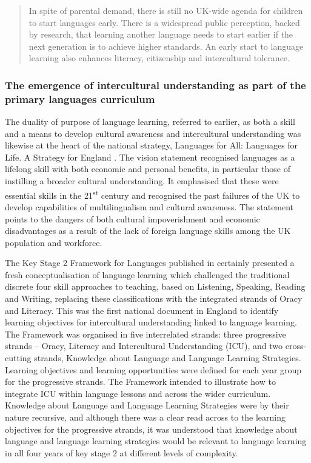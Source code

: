 \documentclass[output=paper]{langscibook}
\begin{document}
\begin{quote}
In spite of parental demand, there is still no UK-wide agenda for children to start languages early. There is a widespread public perception, backed by research, that learning another language needs to start earlier if the next generation is to achieve higher standards. An early start to language learning also enhances literacy, citizenship and intercultural tolerance. \citep[6]{NuffieldFoundation2000}
\end{quote}

\subsubsection{The emergence of intercultural understanding as part of the primary languages curriculum}

The duality of purpose of language learning, referred to earlier, as both a skill and a means to develop cultural awareness and intercultural understanding was likewise at the heart of the national strategy,  Languages for All: Languages for Life. A Strategy for England \citep{DfES2002}. The vision statement recognised languages as a lifelong skill with both economic and personal benefits, in particular those of instilling a broader cultural understanding. It emphasised that these were essential skills in the 21\textsuperscript{st} century and recognised the past failures of the UK to develop capabilities of multilingualism and cultural awareness. The statement points to the dangers of both cultural impoverishment and economic disadvantages as a result of the lack of foreign language skills among the UK population and workforce. 

The Key Stage 2 Framework for Languages published in \citeyear{DCSF2005} certainly presented a fresh conceptualisation of language learning which challenged the traditional discrete four skill approaches to teaching, based on Listening, Speaking, Reading and Writing, replacing these classifications with the integrated strands of Oracy and Literacy. This was the first national document in England to identify learning objectives for intercultural understanding linked to language learning. The Framework was organised in five interrelated strands: three progressive strands -- Oracy, Literacy and Intercultural Understanding (ICU), and two cross-cutting strands, Knowledge about Language and Language Learning Strategies. Learning objectives and learning opportunities were defined for each year group for the progressive strands. The Framework intended to illustrate how to integrate ICU within language lessons and across the wider curriculum. Knowledge about Language and Language Learning Strategies were by their nature recursive, and although there was a clear read across to the learning objectives for the progressive strands, it was understood that knowledge about language and language learning strategies would be relevant to language learning in all four years of key stage 2 at different levels of complexity.
\end{document}
